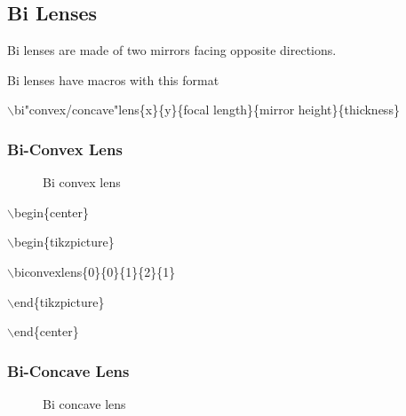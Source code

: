 \documentclass[12pt]{article}
\begin{document}
\subsection{Bi Lenses}

Bi lenses are made of two mirrors facing opposite directions.

Bi lenses have macros with this format 

$\backslash$bi"convex/concave"lens\{x\}\{y\}\{focal length\}\{mirror height\}\{thickness\}

\subsubsection{Bi-Convex Lens}

\begin{figure}[H]

\begin{center}


\end{center}

\caption{Bi convex lens}
\end{figure}

$\backslash$begin\{center\}

$\backslash$begin\{tikzpicture\}

$\backslash$biconvexlens\{0\}\{0\}\{1\}\{2\}\{1\}

$\backslash$end\{tikzpicture\}

$\backslash$end\{center\}

\subsubsection{Bi-Concave Lens}

\begin{figure}[H]

\begin{center}


\end{center}

\caption{Bi concave lens}
\end{figure}
\end{document}
